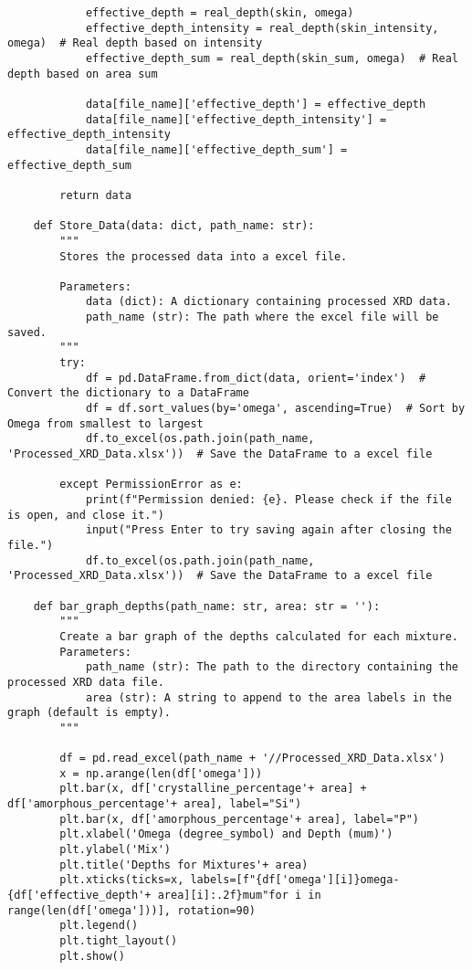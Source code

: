 \begin{lstlisting}
            effective_depth = real_depth(skin, omega)
            effective_depth_intensity = real_depth(skin_intensity, omega)  # Real depth based on intensity
            effective_depth_sum = real_depth(skin_sum, omega)  # Real depth based on area sum

            data[file_name]['effective_depth'] = effective_depth
            data[file_name]['effective_depth_intensity'] = effective_depth_intensity
            data[file_name]['effective_depth_sum'] = effective_depth_sum

        return data

    def Store_Data(data: dict, path_name: str):
        """
        Stores the processed data into a excel file.

        Parameters:
            data (dict): A dictionary containing processed XRD data.
            path_name (str): The path where the excel file will be saved.
        """
        try:
            df = pd.DataFrame.from_dict(data, orient='index')  # Convert the dictionary to a DataFrame
            df = df.sort_values(by='omega', ascending=True)  # Sort by Omega from smallest to largest
            df.to_excel(os.path.join(path_name, 'Processed_XRD_Data.xlsx'))  # Save the DataFrame to a excel file
        
        except PermissionError as e:
            print(f"Permission denied: {e}. Please check if the file is open, and close it.")
            input("Press Enter to try saving again after closing the file.")
            df.to_excel(os.path.join(path_name, 'Processed_XRD_Data.xlsx'))  # Save the DataFrame to a excel file

    def bar_graph_depths(path_name: str, area: str = ''):
        """
        Create a bar graph of the depths calculated for each mixture.
        Parameters:
            path_name (str): The path to the directory containing the processed XRD data file.
            area (str): A string to append to the area labels in the graph (default is empty).
        """

        df = pd.read_excel(path_name + '//Processed_XRD_Data.xlsx')
        x = np.arange(len(df['omega']))
        plt.bar(x, df['crystalline_percentage'+ area] + df['amorphous_percentage'+ area], label="Si")
        plt.bar(x, df['amorphous_percentage'+ area], label="P")
        plt.xlabel('Omega (degree_symbol) and Depth (mum)')
        plt.ylabel('Mix')
        plt.title('Depths for Mixtures'+ area)
        plt.xticks(ticks=x, labels=[f"{df['omega'][i]}omega-{df['effective_depth'+ area][i]:.2f}mum"for i in range(len(df['omega']))], rotation=90)
        plt.legend()
        plt.tight_layout()
        plt.show()


\end{lstlisting}
